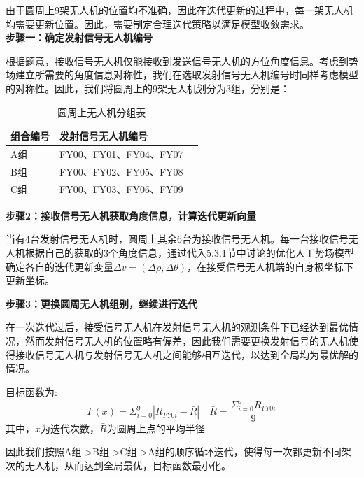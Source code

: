 \documentclass{my_paper}
\begin{document}
由于圆周上9架无人机的位置均不准确，因此在迭代更新的过程中，每一架无人机均需要更新位置。因此，需要制定合理迭代策略以满足模型收敛需求。\\

\textbf{步骤一：确定发射信号无人机编号}

根据题意，接收信号无人机仅能接收到发送信号无人机的方位角度信息。考虑到势场建立所需要的角度信息对称性，我们在选取发射信号无人机编号时同样考虑模型的对称性。因此，我们将圆周上的9架无人机划分为3组，分别是：

\begin{table}[h]%
    \centering
    \caption{圆周上无人机分组表}
    \begin{tabular}{p{2.0cm}<{\centering}p{9.0cm}<{\centering}p{2.0cm}<{\centering}}
        \hline
        组合编号     & 发射信号无人机编号                         \\
        \hline
        A组 &  FY00、FY01、FY04、FY07   \\ %
        B组 &  FY00、FY02、FY05、FY08 \\
        C组 &  FY00、FY03、FY06、FY09 \\
        \hline
    \end{tabular}
\end{table}

\textbf{步骤2：接收信号无人机获取角度信息，计算迭代更新向量}

当有4台发射信号无人机时，圆周上其余6台为接收信号无人机。每一台接收信号无人机根据自己的获取的3个角度信息，通过代入5.3.1节中讨论的优化人工势场模型确定各自的迭代更新变量$\Delta v = (\Delta \rho, \Delta \theta)$，在接受信号无人机端的自身极坐标下更新坐标。

\textbf{步骤3：更换圆周无人机组别，继续进行迭代}

在一次迭代过后，接受信号无人机在发射信号无人机的观测条件下已经达到最优情况，然而发射信号无人机的位置略有偏差，因此我们需要更换发射信号的无人机使得接收信号无人机与发射信号无人机之间能够相互迭代，以达到全局均为最优解的情况。

目标函数为:
\begin{equation}
    F(x) = \Sigma^{9}_{i = 0} \left\lvert R_{FY0i} - \bar R\right\rvert 
    \quad \bar R = \frac{\Sigma^{9}_{i = 0}R_{FY0i}}{9}
\end{equation}
其中，$x$为迭代次数，$\bar R$为圆周上点的平均半径

因此我们按照A组->B组->C组->A组的顺序循环迭代，使得每一次都更新不同架次的无人机，从而达到全局最优，目标函数最小化。
\end{document}
